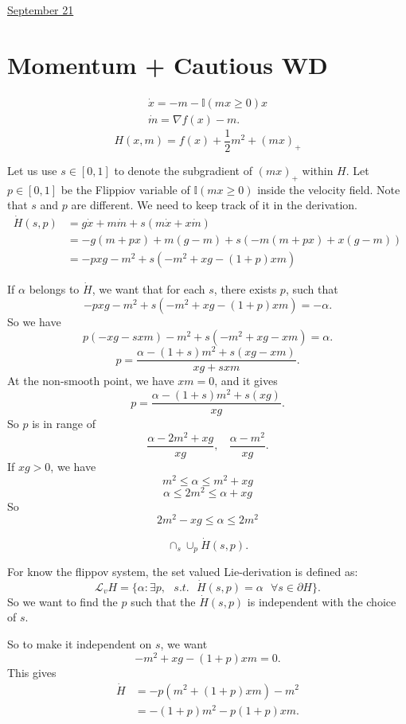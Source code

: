 \documentclass[11pt,letterpaper]{article}
\theoremstyle{definition}
\begin{document}
\href{run:2025-09-21-momentum_cwd.tex}{\Huge September 21} 

\section{Momentum + Cautious WD}

\begin{align}
    \dot x = - m - \mathbb{I}(mx\geq 0) x \\ 
    \dot m = \nabla f(x) - m. 
\end{align}
$$
H(x, m) = f(x) + \frac{1}{2} m^2 + (mx)_+
$$

Let us use $s \in[0,1]$ to denote the subgradient of $(mx)_+$ within $H$. Let $p \in[0,1]$ be the Flippiov variable of $\mathbb{I}(mx \geq 0)$ inside the velocity field. Note that $s$ and $p$ are different. We need to keep track of it in the derivation. 
\begin{align*}
\dot H(s,p) &  =  g \dot x + m \dot m + s (m \dot x + x \dot m) \\ 
& = -g (m + p x) + m(g - m) + s (-m (m + p x) + x (g - m) )\\
& = - p x g - m^2 + s (- m^2 + xg - (1+p)xm)
\end{align*}

If $\alpha$ belongs to $\dot H$, we want that for each $s$, there exists $p$, such that 
$$
- p x g - m^2 + s (- m^2 + xg - (1+p)xm) = -\alpha.
$$
So we have 
$$
p (-xg - s x m ) - m^2 + s (-m^2 + xg - xm) = \alpha. 
$$
$$
p = \frac{\alpha -(1+s) m^2 + s (xg - xm)}{xg +  s xm}. 
$$
At the non-smooth point, we have $xm =0$, and it gives 
$$
p = \frac{\alpha -(1+s) m^2 + s (xg)}{xg}.  
$$
So $p$ is in range of 
$$
\frac{\alpha - 2m^2 + xg}{xg}, ~~~~ 
\frac{\alpha - m^2 }{xg}. 
$$
If $xg >0$, we have 
$$
m^2 \leq \alpha \leq m^2 + xg
$$
$$
\alpha \leq 2m^2 \leq \alpha + xg 
$$
So 
$$
2m^2  - xg \leq \alpha \leq 2 m^2
$$

$$\cap_{s} \cup_{p} \dot H(s, p).$$


For know the flippov system, the set valued Lie-derivation is defined as:
$$
\mathcal L_v H  =   
\{\alpha \colon \exists p, ~~~ s.t. ~~~ \dot H(s,p) = \alpha ~~~\forall s \in \partial H \}.
$$
So we want to find the $p$ such that the $\dot H(s,p)$ is independent with the choice of $s$. 

So to make it independent on $s$, we want 
$$
-m^2 + xg -(1+p)xm  = 0.
$$
This gives
\begin{align*}
\dot H 
& = -p(m^2 + (1+p) xm)- m^2 \\
& = -(1+p)m^2 - p(1+p) xm. 
\end{align*}
\end{document}
